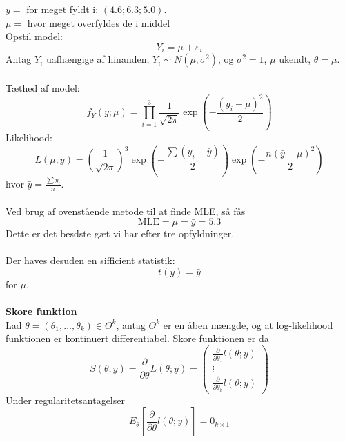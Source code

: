 \documentclass[12pt,a4paper]{report}
\begin{document}
$y=$ for meget fyldt i: $(4.6;6.3;5.0)$.\\
$\mu=$ hvor meget overfyldes de i middel\\
Opstil model:
\begin{equation}
Y_i=\mu+\varepsilon_i
\end{equation}
Antag $Y_i$ uafhængige af hinanden, $Y_i\sim N(\mu,\sigma^2)$, og $\sigma^2=1$, $\mu$ ukendt, $\theta=\mu$.\\\\
Tæthed af model:
\begin{equation}
f_Y(y;\mu)=\prod_{i=1}^3\frac{1}{\sqrt{2\pi}}\exp\left(-\frac{(y_i-\mu)^2}{2}\right)
\end{equation}
Likelihood:
\begin{equation}
L(\mu;y)=\left(\frac{1}{\sqrt{2\pi}}\right)^3\exp\left(-\frac{\sum(y_i-\bar{y})}{2}\right)\exp\left(-\frac{n(\bar{y}-\mu)^2}{2}\right)
\end{equation}
hvor $\bar{y}=\frac{\sum y_i}{n}$.\\\\
Ved brug af ovenstående metode til at finde MLE, så fås
\begin{equation}
\text{MLE}=\mu=\bar{y}=5.3
\end{equation}
Dette er det besdste gæt vi har efter tre opfyldninger.\\\\
Der haves desuden en sifficient statistik:
\begin{equation}
t(y)=\bar{y}
\end{equation}
for $\mu$.\\\\
\textbf{Skore funktion}\\
Lad $\theta=(\theta_1,\ldots,\theta_k)\in\Theta^k$, antag $\Theta^k$ er en åben mængde, og at log-likelihood funktionen er kontinuert differentiabel. Skore funktionen er da
\begin{equation}
S(\theta,y)=\frac{\partial}{\partial\theta}L(\theta;y)=\begin{pmatrix}\frac{\partial}{\partial\theta_1}l(\theta;y)\\ \vdots\\\frac{\partial}{\partial\theta_k}l(\theta;y)\end{pmatrix}
\end{equation}
Under regularitetsantagelser
\begin{equation}
E_{\theta}\left[\frac{\partial}{\partial\theta}l(\theta;y)\right]=0_{k\times1}
\end{equation}
\end{document}
